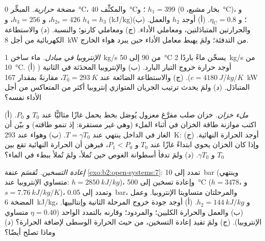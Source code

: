 \begin{exercise}[$\star\star$]\label{exo:b2:open-systems:8}
\emph{مضخة حرارية.} المبخِّر \qty{0}{\celsius}، والمكثِّف \qty{40}{\celsius}؛
و $h_1 = 399$ (بخار مشبع، \qty{0}{\celsius})، و $h_{2s} = 426$، و $h_3 = 256$،
و $h_4 = h_3$ (\unit{kJ/kg})؛ و $\eta_{\text{C}} = 0.8$. (أ) أوجد $h_2$ والعمل.
(ب) والحرارتين المتبادَلتين، ومعاملي الأداء. (ج) ومعاملي كارنو؛ والنسبة. (د) 
والاستطاعة الكهربائية من أجل \qty{8}{kW} من التدفئة؛ ولمَ يهبط معامل الأداء حين
يبرد هواء الخارج.
\end{exercise}

\begin{exercise}[$\star\star$]\label{exo:b2:open-systems:9}
\emph{الإنتروبيا في مبادل.} ماء ساخن \qty{1}{kg/s} من \qty{90}{} إلى
\qty{50}{\celsius} يسخّن ماءً باردًا \qty{2}{kg/s} من \qty{10}{\celsius}.
(أ) أوجد حرارة خروج التيار البارد. (ب) والإنتروبيا المحدَثة في
الثانية ($c = \qty{4180}{J/kg/K}$). (ج) والاستطاعة الضائعة عند $T_0 = \qty{293}{K}$،
مقارنةً بمقدار \qty{167}{kW} المتبادَل. (د) ولمَ يحدث ترتيب الجريان المتوازي
إنتروبيا أكثر من المتعاكس من أجل الأداء نفسه؟
\end{exercise}

\begin{exercise}[$\star\star\star$]\label{exo:b2:open-systems:10}
\emph{ملء خزان.} خزان صلب مفرَّغ معزول يُوصَل
بخط يحمل غازًا مثاليًّا عند $T_0$ و $P_0$. (أ) اكتب موازنة
طاقة الخزان في أثناء الملء (وهي غير مستقرة: إذ تنمو طاقته) و
بيّن أن الغاز في الداخل ينتهي عند $T = \gamma T_0$. (ب) وهواء عند \qty{293}{K}:
أوجد الحرارة النهائية. (ج) وإذا كان الخزان يحوي ابتداءً غازًا عند $T_0$ و
$P_1 < P_0$، فبرهن أن الحرارة النهائية تقع بين $T_0$ و
$\gamma T_0$. (د) ولمَ تدفأ أسطوانة الغوص حين تُملأ، ولمَ
تُملأ ببطء في الماء؟
\end{exercise}

\begin{exercise}[$\star\star\star$]\label{exo:b2:open-systems:11}
\emph{إعادة التسخين.} تُقسَم عنفة \cref{exo:b2:open-systems:7}:
تمدد إلى \qty{10}{bar} (وينتهي متساوي الإنتروبيا عند: $h = \qty{2850}{kJ/kg}$)، وإعادة تسخين
إلى \qty{500}{\celsius} ($h = 3478$، و $s = \qty{7.76}{kJ/kg/K}$)، وتمدد إلى
\qty{0.05}{bar}، والمرحلتان متساويتا الإنتروبيا. وعمل المضخة \qty{6}{kJ/kg}، و $h_2 =
\qty{144}{kJ/kg}$. (أ) أوجد جودة خروج المرحلة الثانية وإنتالبيها. (ب)
والعمل والحرارة الكليين؛ والمردود؛ وقارنه بالتمدد الواحد
($\eta = 0.40$ متساوي الإنتروبيا). (ج) ولمَ تفيد إعادة التسخين، من حيث
الحرارة الوسطى لإضافة الحرارة؟ (د) وماذا تصلح أيضًا؟
\end{exercise}


